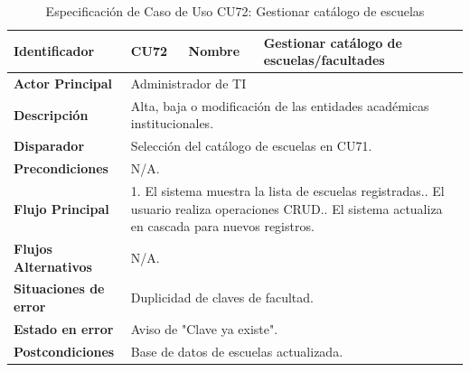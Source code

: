 \begingroup
\setlength{\parskip}{0pt}
\begin{longtable}{|p{3.5cm}|p{2cm}|p{2.5cm}|p{7cm}|}
\caption{Especificación de Caso de Uso CU72: Gestionar catálogo de escuelas}
\label{tab:cu72} \\
\hline
\textbf{Identificador} & CU72 & \textbf{Nombre} & Gestionar catálogo de escuelas/facultades \\ \hline
\textbf{Actor Principal} & \multicolumn{3}{p{11.5cm}|}{Administrador de TI} \\ \hline
\textbf{Descripción} & \multicolumn{3}{p{11.5cm}|}{Alta, baja o modificación de las entidades académicas institucionales.} \\ \hline
\textbf{Disparador} & \multicolumn{3}{p{11.5cm}|}{Selección del catálogo de escuelas en CU71.} \\ \hline
\textbf{Precondiciones} & \multicolumn{3}{p{11.5cm}|}{N/A.} \\ \hline
\textbf{Flujo Principal} & \multicolumn{3}{p{11.5cm}|}{1. El sistema muestra la lista de escuelas registradas.\newline 2. El usuario realiza operaciones CRUD.\newline 3. El sistema actualiza en cascada para nuevos registros.} \\ \hline
\textbf{Flujos Alternativos} & \multicolumn{3}{p{11.5cm}|}{N/A.} \\ \hline
\textbf{Situaciones de error} & \multicolumn{3}{p{11.5cm}|}{Duplicidad de claves de facultad.} \\ \hline
\textbf{Estado en error} & \multicolumn{3}{p{11.5cm}|}{Aviso de "Clave ya existe".} \\ \hline
\textbf{Postcondiciones} & \multicolumn{3}{p{11.5cm}|}{Base de datos de escuelas actualizada.} \\ \hline
\end{longtable}
\endgroup

\vspace{0.8cm}

